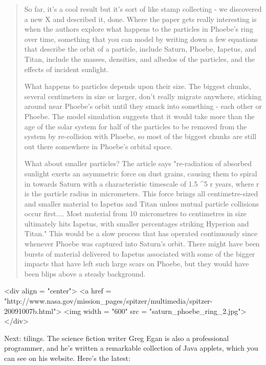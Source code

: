 \begin{quote}
    So far, it's a cool result but it's sort of like stamp collecting -
    we discovered a new X and described it, done. Where the paper gets 
    really interesting is when the authors explore what happens to the
    particles in Phoebe's ring over time, something that you can model
    by writing down a few equations that describe the orbit of a
    particle, include Saturn, Phoebe, Iapetus, and Titan, include 
    the masses, densities, and albedos of the particles, and the 
    effects of incident sunlight.

    What happens to particles depends upon their size. The biggest 
    chunks, several centimeters in size or larger, don't really 
    migrate anywhere, sticking around near Phoebe's orbit until 
    they smack into something - each other or Phoebe.  The model
    simulation suggests that it would take more than the age of 
    the solar system for half of the particles to be removed from 
    the system by re-collision with Phoebe, so most of the biggest
    chunks are still out there somewhere in Phoebe's orbital space.

    What about smaller particles? The article says "re-radiation
    of absorbed sunlight exerts an asymmetric force on dust grains,
    causing them to spiral in towards Saturn with a characteristic
    timescale of 1.5 ^{5} r years, where r is the
    particle radius in micrometers.  This force brings all
    centimetre-sized and smaller material to Iapetus and Titan unless
    mutual particle collisions occur first.... Most material from 10
    micrometres to centimetres in size ultimately hits Iapetus, with
    smaller percentages striking Hyperion and Titan." This would
    be a slow process that has operated continuously since whenever
    Phoebe was captured into Saturn's orbit.  There might have been
    bursts of material delivered to Iapetus associated with some of
    the bigger impacts that have left such large scars on Phoebe, but
    they would have been blips above a steady background.
\end{quote}

<div align = "center">
<a href = "http://www.nasa.gov/mission_pages/spitzer/multimedia/spitzer-20091007b.html">
<img width = "600" src = "saturn_phoebe_ring_2.jpg">
</div>

Next: tilings.  The science fiction writer Greg Egan is also a
professional programmer, and he's written a remarkable collection
of Java applets, which you can see on his website.  Here's the latest:

